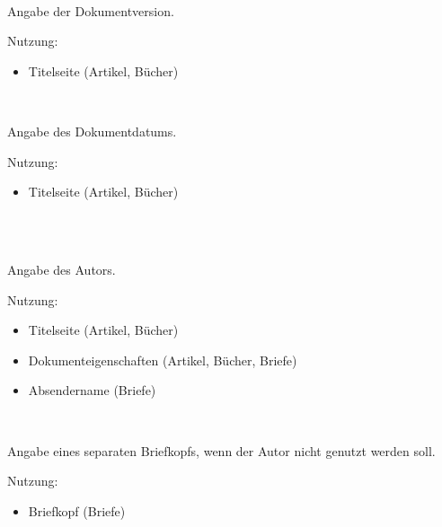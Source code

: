 \begin{nutzung}
		\>\\
	\beispiel
		\>
\end{nutzung}

\DescribeMacro{\version}
Angabe der Dokumentversion.

Nutzung:
\begin{itemize}
	\item Titelseite (Artikel, Bücher)
\end{itemize}

\begin{nutzung}
		\>\\
	\beispiel
		\>
\end{nutzung}

\DescribeMacro{\date}
Angabe des Dokumentdatums.

Nutzung:
\begin{itemize}
	\item Titelseite (Artikel, Bücher)
\end{itemize}

\begin{nutzung}
		\>\\
	\beispiel
		\>\\
		\>
\end{nutzung}

\DescribeMacro{\author}
Angabe des Autors.

Nutzung:
\begin{itemize}
	\item Titelseite (Artikel, Bücher)
	\item Dokumenteigenschaften (Artikel, Bücher, Briefe)
	\item Absendername (Briefe)
\end{itemize}

\begin{nutzung}
		\>\\
	\beispiel
		\>
\end{nutzung}

\DescribeMacro{\briefkopf}
Angabe eines separaten Briefkopfs, wenn der Autor nicht genutzt werden soll.

Nutzung:
\begin{itemize}
	\item Briefkopf (Briefe)
\end{itemize}

